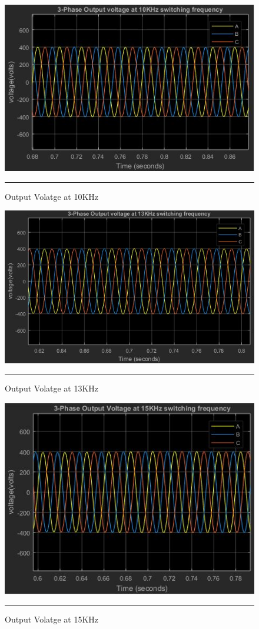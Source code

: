 \begin{figure}[htbp]
	\centering
	\includegraphics[width = 6in]{./Figures/10k.JPG}
	\rule{35em}{1pt}
	\caption{Output Volatge at 10KHz}
\end{figure}
\begin{figure}[htbp]
	\centering
	\includegraphics[width = 6in]{./Figures/13k.JPG}
	\rule{35em}{1pt}
	\caption{Output Volatge at 13KHz}
\end{figure}
\begin{figure}[htbp]
	\centering
	\includegraphics[width = 6in]{./Figures/15k.JPG}
	\rule{35em}{1pt}
	\caption{Output Volatge at 15KHz}
\end{figure}
